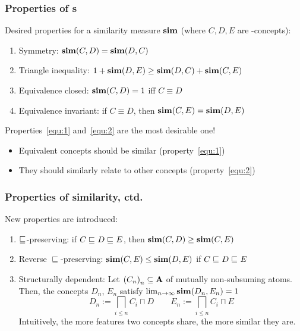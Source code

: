 \documentclass[smaller]{beamer}
\newcounter{simprop}
\newcommand{\propstop}{\setcounter{simprop}{\theenumi}}
\newcommand{\propplay}{\setcounter{enumi}{\thesimprop}}
\begin{document}
\begin{frame}
  \frametitle{Properties of \csm{}s}
  Desired properties for a 
  \alert{similarity measure} \(\operatorname{\mathbf{sim}}\) (where \(C,D,E\) are \elh-concepts):
  \begin{enumerate}[<+->]
    \item \alert{Symmetry}: \(\operatorname{\mathbf{sim}}(C,D) = \operatorname{\mathbf{sim}}(D,C)\)
    \item \alert{Triangle inequality}:
      \(1 + \operatorname{\mathbf{sim}}(D,E) \ge \operatorname{\mathbf{sim}}(D,C) + \operatorname{\mathbf{sim}}(C,E)\)
    \item\label{equ:1} \alert{Equivalence closed}:
      \(\operatorname{\mathbf{sim}}(C,D) = 1\) iff \(C \equiv D\)
    \item\label{equ:2} \alert{Equivalence invariant}:
      if \(C \equiv D\), then
      \(\operatorname{\mathbf{sim}}(C,E) = \operatorname{\mathbf{sim}}(D,E)\)
    \propstop
  \end{enumerate}
  Properties~\ref{equ:1} and~\ref{equ:2} are the most desirable one!
  \begin{itemize}
    \item Equivalent concepts should be similar (property~\ref{equ:1})
    \item They should similarly relate to other concepts (property~\ref{equ:2})
  \end{itemize}
\end{frame}

\begin{frame}
  \frametitle{Properties of similarity, ctd.}
  New properties are introduced:
  \begin{enumerate}[<+->]
    \propplay
    \item \alert{\(\sqsubseteq_{\mathcal{}}\)-preserving}: if \(C \sqsubseteq_{\mathcal{}} D \sqsubseteq_{\mathcal{}} E\),
    then \(\operatorname{\mathbf{sim}}(C,D) \ge \operatorname{\mathbf{sim}}(C,E)\)
    \item \alert{Reverse \(\sqsubseteq\)-preserving}: 
    \(\operatorname{\mathbf{sim}}(C,E) \le \operatorname{\mathbf{sim}}(D,E)\) if
    \(C \sqsubseteq_{\mathcal{}} D \sqsubseteq_{\mathcal{}} E\)
    \item \alert{Structurally dependent}: 
    Let \({(C_n)}_n \subseteq \mathbf{A}\) of mutually
    non-subsuming atoms. Then, the concepts
    \(D_n\), \(E_n\) satisfy
    \(\lim_{n \to \infty} \operatorname{\mathbf{sim}}(D_n,E_n) = 1\)
    \begin{equation*}
      D_n := \bigsqcap_{i \le n} C_i \sqcap D \qquad
      E_n := \bigsqcap_{i \le n} C_i \sqcap E
    \end{equation*}
    Intuitively, the more \alert{features}
    two concepts share, the more similar they are.
  \end{enumerate}
\end{frame}
\end{document}
